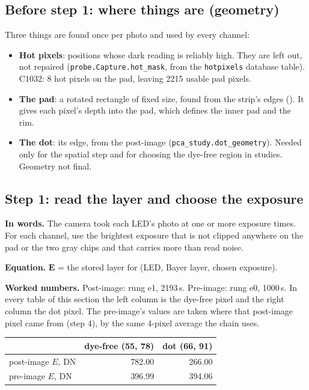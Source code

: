 \documentclass[11pt,letter]{article}
\newcommand{\file}[1]{\texttt{\seqsplit{#1}}}
\newcommand{\code}[1]{\texttt{#1}}
\newcommand{\mE}{\mathbf{E}}   %
\begin{document}
\subsection*{Before step 1: where things are (geometry)}

Three things are found once per photo and used by every channel:
\begin{itemize}
  \item \textbf{Hot pixels}: positions whose dark reading is reliably high.
    They are left out, not repaired (\code{probe.Capture.hot\_mask}, from
    the \code{hotpixels} database table).  C1032: 8 hot pixels on the pad, leaving 2215 usable pad pixels.
  \item \textbf{The pad}: a rotated rectangle of fixed size, found from the
    strip's edges (\file{padrect.PadRect}).  It gives each pixel's depth
    into the pad, which defines the inner pad and the rim.
  \item \textbf{The dot}: its edge, from the post-image
    (\code{pca\_study.dot\_geometry}).  Needed only for the spatial step and
    for choosing the dye-free region in studies.  Geometry not final.
\end{itemize}

\subsection{Step 1: read the layer and choose the exposure}

\textbf{In words.}  The camera took each LED's photo at one or more
exposure times.  For each channel, use the brightest exposure that is not
clipped anywhere on the pad or the two gray chips and that carries more
than read noise.

\textbf{Equation.}  $\mE$ = the stored layer for (LED, Bayer layer,
chosen exposure).

\textbf{Worked numbers.}  Post-image: rung e1, 2193\,\textmu s.  Pre-image:
rung e0, 1000\,\textmu s.  In every table of this section the left column is
the dye-free pixel and the right column the dot pixel.  The pre-image's
values are taken where that post-image pixel came from (step 4), by the
same 4-pixel average the chain uses.

\medskip
\begin{center}
\begin{tabular}{@{}lrr@{}}
\toprule
 & dye-free (55, 78) & dot (66, 91) \\
\midrule
post-image $E$, DN & 782.00 & 266.00 \\
pre-image $E$, DN  & 396.99 & 394.06 \\
\bottomrule
\end{tabular}
\end{center}
\end{document}

